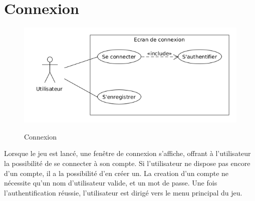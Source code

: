\documentclass[../besoin_user.tex]{subfiles}
\begin{document}
\section{Connexion}
\begin{figure}[h]
    \centering
    \includegraphics[scale=0.6]{img_fonctionnel/use_case_user_connexion.png}
    \label{fig:user_connexion}
    \caption{Connexion}
\end{figure}
  Lorsque le jeu est lancé, une fenêtre de connexion s'affiche, offrant à l'utilisateur la possibilité de se connecter à son compte. 
  Si l'utilisateur ne dispose pas encore d'un compte, il a la possibilité d'en créer un. 
  La creation d'un compte ne nécessite qu'un nom d'utilisateur valide, et un mot de passe. 
  Une fois l'authentification réussie, l'utilisateur est dirigé vers le menu principal du jeu.
  \newpage
\end{document}
